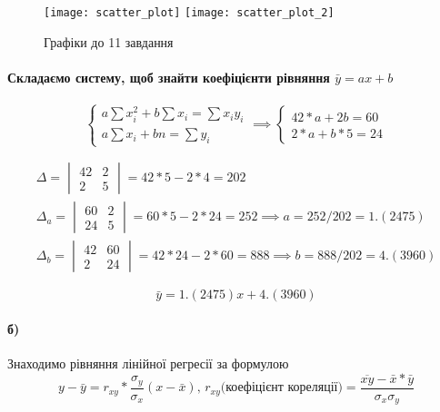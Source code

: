 \documentclass[a4paper, 12pt, oneside]{extarticle}
\begin{document}
\begin{figure}
	\centering
	 {
	\texttt{[image: scatter\_plot]}
	}
	 {
	\texttt{[image: scatter\_plot\_2]}
	}
	\caption{Графіки до 11 завдання}
\end{figure}

\paragraph{Складаємо систему, щоб знайти коефіцієнти рівняння $\bar y=ax+b$}

$$
\begin{cases}
	a \sum x_i^2 + b \sum x_i = \sum x_i y_i \\
	a \sum x_i + bn = \sum y_i
\end{cases}
\implies
\begin{cases}
	42*a + 2b = 60 \\
	2*a + b*5 = 24
\end{cases}
$$

\begin{align}
\Delta =
\begin{vmatrix}
	42 & 2 \\
	2 & 5
\end{vmatrix}
= 42*5-2*4 = 202
\\
\Delta_a =
\begin{vmatrix}
	60 & 2 \\
	24 & 5
\end{vmatrix}
= 60*5-2*24 = 252
\implies a = 252/202 = 1.(2475)
\\
\Delta_b =
\begin{vmatrix}
	42 & 60 \\
	2  & 24
\end{vmatrix}
= 42*24-2*60 = 888
\implies b = 888/202 = 4.(3960)
\end{align}

$$
\bar y = 1.(2475)x + 4.(3960)
$$

\paragraph{б)} Знаходимо рівняння лінійної регресії за формулою
$$
y - \bar y = r_{xy} * \frac{\sigma_y}{\sigma_x}(x-\bar x),\,
r_{xy} \text{(коефіцієнт кореляції)} = \frac{\overline{xy} - \bar x * \bar y}{\sigma_x\sigma_y}
$$
\end{document}
